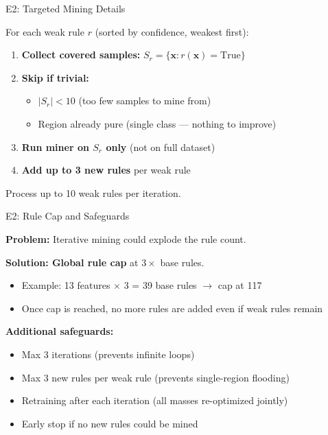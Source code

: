 \documentclass[aspectratio=169,12pt]{beamer}
\begin{document}
\begin{frame}{E2: Targeted Mining Details}

For each weak rule $r$ (sorted by confidence, weakest first):

\vspace{1em}
\begin{enumerate}
    \item \textbf{Collect covered samples:} $S_r = \{\mathbf{x} : r(\mathbf{x}) = \text{True}\}$

    \vspace{0.5em}
    \item \textbf{Skip if trivial:}
    \begin{itemize}
        \item $|S_r| < 10$ (too few samples to mine from)
        \item Region already pure (single class --- nothing to improve)
    \end{itemize}

    \vspace{0.5em}
    \item \textbf{Run miner on $S_r$ only} (not on full dataset)

    \vspace{0.5em}
    \item \textbf{Add up to 3 new rules} per weak rule
\end{enumerate}

\vspace{1em}
Process up to 10 weak rules per iteration.

\end{frame}

\begin{frame}{E2: Rule Cap and Safeguards}

\textbf{Problem:} Iterative mining could explode the rule count.

\vspace{1em}
\textbf{Solution: Global rule cap} at $3\times$ base rules.

\vspace{0.5em}
\begin{itemize}
    \item Example: 13 features $\times$ 3 = 39 base rules $\rightarrow$ cap at 117
    \item Once cap is reached, no more rules are added even if weak rules remain
\end{itemize}

\vspace{1.5em}
\textbf{Additional safeguards:}
\begin{itemize}
    \item Max 3 iterations (prevents infinite loops)
    \item Max 3 new rules per weak rule (prevents single-region flooding)
    \item Retraining after each iteration (all masses re-optimized jointly)
    \item Early stop if no new rules could be mined
\end{itemize}

\end{frame}
\end{document}
